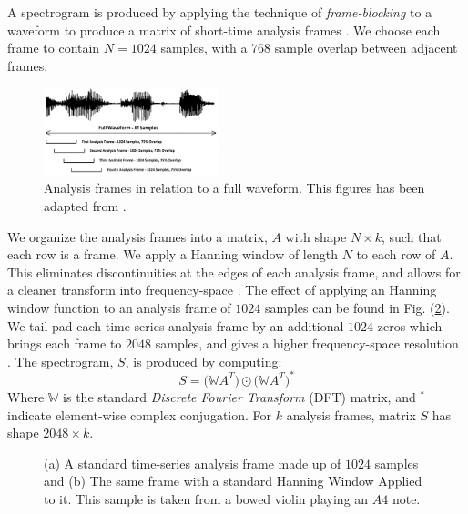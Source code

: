\documentclass[conference,onecolumn,letterpaper]{IEEEtran}
\begin{document}
A spectrogram is produced by applying the technique of \textit{frame-blocking} to a waveform to produce a matrix of short-time analysis frames \cite{Liu,Virtanen}. We choose each frame to contain $N = 1024$ samples, with a $768$ sample overlap between adjacent frames. 
\begin{figure}[H]
    \centering
    \includegraphics[width=0.45\textwidth]{figures/AnalysisFrames.png}
    \caption{Analysis frames in relation to a full waveform. This figures has been adapted from \cite{Liu}.}
    \label{fig:AnalysisFrames}
\end{figure}
We organize the analysis frames into a matrix, $A$ with shape $N \times k$, such that each row is a frame. We apply a Hanning window of length $N$ to each row of $A$. This eliminates discontinuities at the edges of each analysis frame, and allows for a cleaner transform into frequency-space \cite{Virtanen}. The effect of applying an Hanning window function to an analysis frame of $1024$ samples can be found in Fig. (\ref{fig:WindowFrame}). We tail-pad each time-series analysis frame by an additional $1024$ zeros which brings each frame to $2048$ samples, and gives a higher frequency-space resolution \cite{Sahidullah}. The spectrogram, $S$, is produced by computing:
\begin{equation}
    \label{eqn:Spectrogram}
    S = \big( \mathbb{W}A^T \big) \odot \big( \mathbb{W}A^T \big)^* 
\end{equation}
Where $\mathbb{W}$ is the standard \textit{Discrete Fourier Transform} (DFT) matrix, and $^*$ indicate element-wise complex conjugation. For $k$ analysis frames, matrix $S$ has shape $2048 \times k$. 

\begin{figure}[h]
    \centering
    \caption{(a) A standard time-series analysis frame made up of $1024$ samples and (b) The same frame with a standard Hanning Window Applied to it. This sample is taken from a bowed violin playing an $A4$ note.}
    \label{fig:WindowFrame}
\end{figure}
\end{document}
